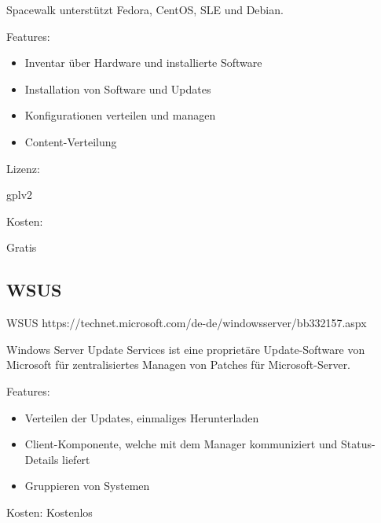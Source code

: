 Spacewalk unterstützt Fedora, CentOS, SLE und Debian.

Features:

\begin{itemize}
\item Inventar über Hardware und installierte Software
\item Installation von Software und Updates
\item Konfigurationen verteilen und managen
\item Content-Verteilung
\end{itemize}

Lizenz:

\gls{gplv2}

Kosten:

Gratis



\subsection{WSUS}

\gls{WSUS}
https://technet.microsoft.com/de-de/windowsserver/bb332157.aspx

Windows Server Update Services ist eine proprietäre Update-Software von Microsoft für zentralisiertes Managen von Patches für Microsoft-Server.

Features:

\begin{itemize}
\item Verteilen der Updates, einmaliges Herunterladen
\item Client-Komponente, welche mit dem Manager kommuniziert und Status-Details liefert
\item Gruppieren von Systemen
\end{itemize}

Kosten:
Kostenlos
